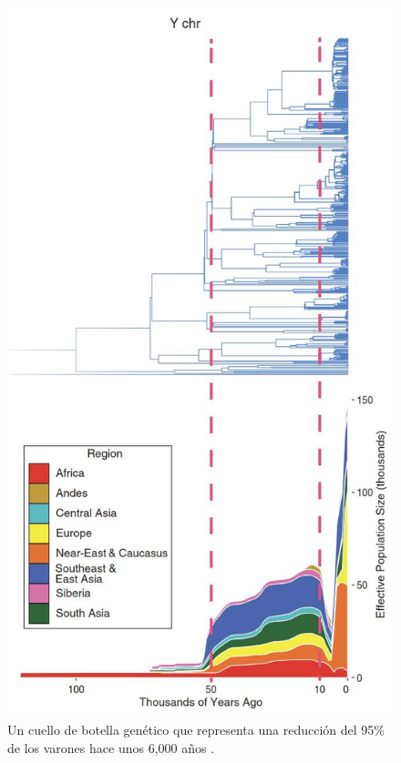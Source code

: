 \documentclass[10pt,twocolumn,letterpaper]{article}
\begin{document}
\begin{figure}[b]
\begin{center}
   \includegraphics[width=1\linewidth]{bottleneck.jpg}
\end{center}
   \caption{Un cuello de botella genético que representa una reducción del 95\% de los varones hace unos 6,000 años \cite{62}.}
\label{fig:10}
\label{fig:onecol}
\end{figure}
\end{document}
